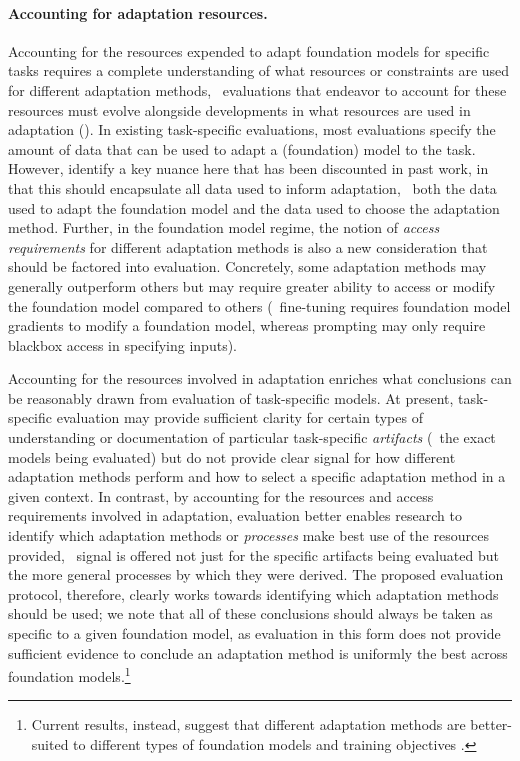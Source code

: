 \paragraph{Accounting for adaptation resources.}
Accounting for the resources expended to adapt foundation models for specific tasks requires a complete understanding of what resources or constraints are used for different adaptation methods, \ie~evaluations that endeavor to account for these resources must evolve alongside developments in what resources are used in adaptation ().
In existing task-specific evaluations, most evaluations specify the amount of data that can be used to adapt a (foundation) model to the task. 
However, \citet{perez2021true} identify a key nuance here that has been discounted in past work, in that this should encapsulate all data used to inform adaptation, \ie~both the data used to adapt the foundation model and the data used to choose the adaptation method.
Further, in the foundation model regime, the notion of \textit{access requirements} for different adaptation methods is also a new consideration that should be factored into evaluation.
Concretely, some adaptation methods may generally outperform others but may require greater ability to access or modify the foundation model compared to others (\eg~fine-tuning requires foundation model gradients to modify a foundation model, whereas prompting may only require blackbox access in specifying inputs). 

Accounting for the resources involved in adaptation enriches what conclusions can be reasonably drawn from evaluation of task-specific models.
At present, task-specific evaluation may provide sufficient clarity for certain types of understanding or documentation of particular task-specific \textit{artifacts} (\ie~the exact models being evaluated) but do not provide clear signal for how different adaptation methods perform and how to select a specific adaptation method in a given context.
In contrast, by accounting for the resources and access requirements involved in adaptation, evaluation better enables research to identify which adaptation methods or \textit{processes} make best use of the resources provided, \ie~signal is offered not just for the specific artifacts being evaluated but the more general processes by which they were derived.
The proposed evaluation protocol, therefore, clearly works towards identifying which adaptation methods should be used; we note that all of these conclusions should always be taken as specific to a given foundation model, as evaluation in this form does not provide sufficient evidence to conclude an adaptation method is uniformly the best across foundation models.\footnote{Current results, instead, suggest that different adaptation methods are better-suited to different types of foundation models and training objectives \citep{liu2021prompt,lester2021power}.}

